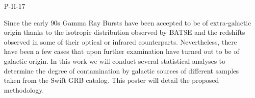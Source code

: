 P-II-17


\bigskip



\bigskip

\noindent Since the early 90s Gamma Ray Bursts have been accepted to be of extra-galactic origin thanks to the isotropic distribution observed by BATSE and the redshifts observed in some of their optical or infrared counterparts. Nevertheless, there have been a few cases that upon further examination have turned out to be of galactic origin. In this work we will conduct several statistical analyses to determine the degree of contamination by galactic sources of different samples taken from the Swift GRB catalog. This poster will detail the proposed methodology.
